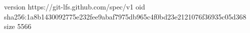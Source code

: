 version https://git-lfs.github.com/spec/v1
oid sha256:1a8b1430092775e232fee9abaf7975db965c4f0bd23e2121076f36935c05d368
size 5566
